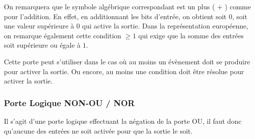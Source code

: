 \documentclass[11pt,a4paper]{article}
\begin{document}
On remarquera que le symbole algébrique correspondant est un plus ( $ + $ ) comme pour l'addition.
En effet, en additionnant les bits d'entrée, on obtient soit $ 0 $, soit une valeur supérieure à $ 0 $ qui active la sortie.
Dans la représentation européenne, on remarque également cette condition $ \geq 1 $ qui exige que la somme des entrées soit supérieure ou égale à $ 1 $.

\medskip

Cette porte peut s'utiliser dans le cas où au moins un évènement doit se produire pour activer la sortie.
Ou encore, au moins une condition doit être résolue pour activer la sortie.


\medskip

\vfillFirst

\vfillLast

\subsubsection{Porte Logique NON-OU / NOR}

Il s'agit d'une porte logique effectuant la négation de la porte OU, il faut donc qu'aucune des entrées ne soit activée pour que la sortie le soit.

\medskip
\end{document}
